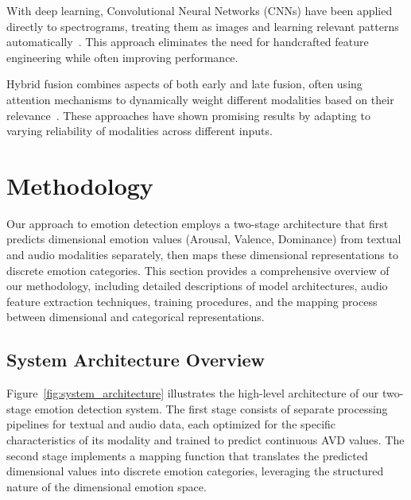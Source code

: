 \documentclass[12pt]{article}
\begin{document}
With deep learning, Convolutional Neural Networks (CNNs) have been applied directly to spectrograms, treating them as images and learning relevant patterns automatically~\cite{mao2014learning}. This approach eliminates the need for handcrafted feature engineering while often improving performance.

Hybrid fusion combines aspects of both early and late fusion, often using attention mechanisms to dynamically weight different modalities based on their relevance~\cite{zadeh2018memory}. These approaches have shown promising results by adapting to varying reliability of modalities across different inputs.\section{Methodology}
\label{sec:methodology}
Our approach to emotion detection employs a two-stage architecture that first predicts dimensional emotion values (Arousal, Valence, Dominance) from textual and audio modalities separately, then maps these dimensional representations to discrete emotion categories. This section provides a comprehensive overview of our methodology, including detailed descriptions of model architectures, audio feature extraction techniques, training procedures, and the mapping process between dimensional and categorical representations.

\subsection{System Architecture Overview}
Figure~\ref{fig:system_architecture} illustrates the high-level architecture of our two-stage emotion detection system. The first stage consists of separate processing pipelines for textual and audio data, each optimized for the specific characteristics of its modality and trained to predict continuous AVD values. The second stage implements a mapping function that translates the predicted dimensional values into discrete emotion categories, leveraging the structured nature of the dimensional emotion space.
\end{document}
